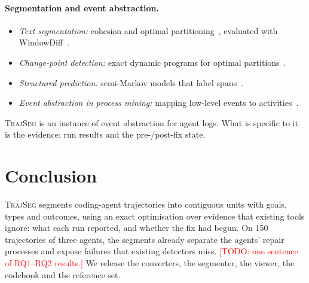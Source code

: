 \documentclass[sigconf,nonacm,10pt]{acmart}
\newcommand{\TODO}[1]{\textcolor{red}{[TODO: #1]}}
\newcommand{\tool}{\textsc{TrajSeg}}   %
\begin{document}
\paragraph{Segmentation and event abstraction.}
\begin{itemize}
  \item \emph{Text segmentation:} cohesion and optimal
        partitioning~\cite{hearst1997texttiling,utiyama2001segmentation}, evaluated
        with WindowDiff~\cite{pevzner2002windowdiff}.
  \item \emph{Change-point detection:} exact dynamic programs for optimal
        partitions~\cite{jackson2005optimal,killick2012pelt}.
  \item \emph{Structured prediction:} semi-Markov models that label
        spans~\cite{sarawagi2004semicrf,lafferty2001crf}.
  \item \emph{Event abstraction in process mining:} mapping low-level events to
        activities~\cite{vanzelst2021eventabstraction,mannhardt2018guided,tax2016eventabstraction}.
\end{itemize}
\tool{} is an instance of event abstraction for agent logs. What is specific to it is
the evidence: run results and the pre-/post-fix state.

\section{Conclusion}
\label{sec:conclusion}
\tool{} segments coding-agent trajectories into contiguous units with goals, types and
outcomes, using an exact optimisation over evidence that existing tools ignore: what
each run reported, and whether the fix had begun. On 150 trajectories of three agents,
the segments already separate the agents' repair processes and expose failures that
existing detectors miss. \TODO{one sentence of RQ1--RQ2 results.} We release the
converters, the segmenter, the viewer, the codebook and the reference set.

\balance


\end{document}

